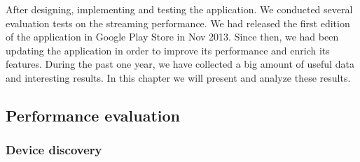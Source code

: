 
After designing, implementing and testing the application. We conducted several evaluation tests on the streaming performance. We had released the first edition of the application in Google Play Store in Nov 2013. Since then, we had been updating the application in order to improve its performance and enrich its features. During the past one year, we have collected a big amount of useful data and interesting results. In this chapter we will present and analyze these results.

\subsection{Performance evaluation}
\subsubsection{Device discovery}

